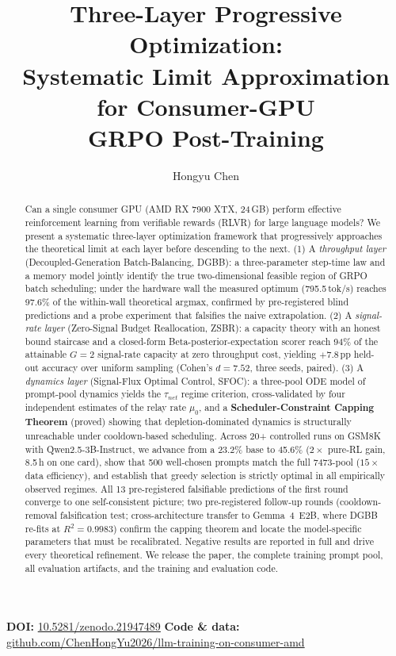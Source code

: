\documentclass[11pt]{article}
\title{\textbf{Three-Layer Progressive Optimization:\\
Systematic Limit Approximation for Consumer-GPU\\
GRPO Post-Training}}
\author{Hongyu Chen}
\date{}
\theoremstyle{definition}
\begin{document}
\maketitle
\vspace{-2em}
\begin{center}\small
\textbf{DOI:} \href{https://doi.org/10.5281/zenodo.21947489}{10.5281/zenodo.21947489} \quad
\textbf{Code \& data:} \href{https://github.com/ChenHongYu2026/llm-training-on-consumer-amd}{github.com/ChenHongYu2026/llm-training-on-consumer-amd}
\end{center}
\vspace{1em}

\begin{abstract}
Can a single consumer GPU (AMD RX 7900 XTX, 24\,GB) perform effective reinforcement
learning from verifiable rewards (RLVR) for large language models? We present a
systematic three-layer optimization framework that progressively approaches the
theoretical limit at each layer before descending to the next.
(1) A \emph{throughput layer} (Decoupled-Generation Batch-Balancing, DGBB): a
three-parameter step-time law and a memory model jointly identify the true
two-dimensional feasible region of GRPO batch scheduling; under the hardware wall
the measured optimum (795.5\,tok/s) reaches 97.6\% of the within-wall theoretical
argmax, confirmed by pre-registered blind predictions and a probe experiment that
falsifies the naive extrapolation.
(2) A \emph{signal-rate layer} (Zero-Signal Budget Reallocation, ZSBR): a capacity
theory with an honest bound staircase and a closed-form Beta-posterior-expectation
scorer reach 94\% of the attainable $G{=}2$ signal-rate capacity at zero throughput
cost, yielding $+7.8$\,pp held-out accuracy over uniform sampling (Cohen's
$d{=}7.52$, three seeds, paired).
(3) A \emph{dynamics layer} (Signal-Flux Optimal Control, SFOC): a three-pool ODE
model of prompt-pool dynamics yields the $\tau_{net}$ regime criterion,
cross-validated by four independent estimates of the relay rate $\mu_0$, and a
\textbf{Scheduler-Constraint Capping Theorem} (proved) showing that
depletion-dominated dynamics is structurally unreachable under cooldown-based
scheduling. Across 20+ controlled runs on GSM8K with Qwen2.5-3B-Instruct, we
advance from a 23.2\% base to 45.6\% ($2\times$ pure-RL gain, 8.5\,h on one card),
show that 500 well-chosen prompts match the full 7473-pool ($15\times$ data
efficiency), and establish that greedy selection is strictly optimal in all
empirically observed regimes. All 13 pre-registered falsifiable predictions of the
first round converge to one self-consistent picture; two pre-registered follow-up
rounds (cooldown-removal falsification test; cross-architecture transfer to
Gemma~4~E2B, where DGBB re-fits at $R^2{=}0.9983$) confirm the capping theorem and
locate the model-specific parameters that must be recalibrated. Negative results
are reported in full and drive every theoretical refinement. We release the paper,
the complete training prompt pool, all evaluation artifacts, and the training and
evaluation code.
\end{abstract}
\end{document}
